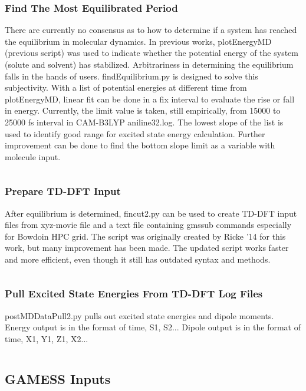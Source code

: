 \documentclass[
journal=jpcbfk, %
manuscript=article]{achemso}
\begin{document}
	\subsubsection{Find The Most Equilibrated Period}
	There are currently no consensus as to how to determine if a system has reached the equilibrium in molecular dynamics. In previous works, plotEnergyMD (previous script) was used to indicate whether the potential energy of the system (solute and solvent) has stabilized. Arbitrariness in determining the equilibrium falls in the hands of users. findEquilibrium.py is designed to solve this subjectivity. With a list of potential energies at different time from plotEnergyMD, linear fit can be done in a fix interval to evaluate the rise or fall in energy. Currently, the limit value is taken, still empirically, from 15000 to 25000 fs interval in CAM-B3LYP aniline32.log. The lowest slope of the list is used to identify good range for excited state energy calculation. Further improvement can be done to find the bottom slope limit as a variable with molecule input.
	\inputminted[linenos, breaklines, baselinestretch=1, fontsize=\small]{python}{../pythonScripts/findEquilibrium10ps.py} 
	
	\subsubsection{Prepare TD-DFT Input}
	After equilibrium is determined, fincut2.py can be used to create TD-DFT input files from xyz-movie file and a text file containing gmssub commands especially for Bowdoin HPC grid. The script was originally created by  Ricke '14 for this work, but many improvement has been made. The updated script works faster and more efficient, even though it still has outdated syntax and methods.
	\inputminted[linenos, breaklines, baselinestretch=1, fontsize=\small]{python}{../pythonScripts/fincut2_combined.py} 
	
	\subsubsection{Pull Excited State Energies From TD-DFT Log Files}
	postMDDataPull2.py pulls out excited state energies and dipole moments. Energy output is in the format of time, S1, S2... Dipole output is in the format of time, X1, Y1, Z1, X2...
	\inputminted[linenos, breaklines, baselinestretch=1, fontsize=\small]{python}{../pythonScripts/postMDDataPull2.py} 
	
	\subsection{GAMESS Inputs}
\end{document}
